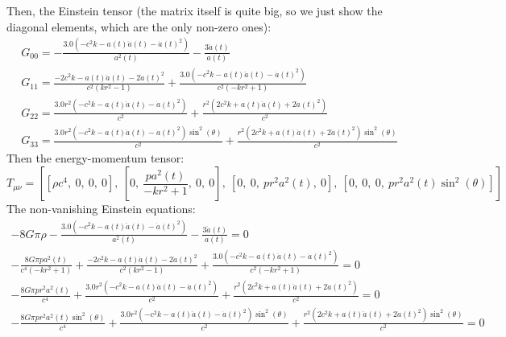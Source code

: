 \documentclass{article}
\begin{document}
Then, the Einstein tensor (the matrix itself is quite big, so we just show the diagonal elements, which are the only non-zero ones):
\begin{equation}
\begin{gathered}
    G_{00} = - \frac{3.0 \left(- c^{2} k - a{\left(t \right)} \ddot{a}(t) - \dot{a}(t)^{2}\right)}{a^{2}{\left(t \right)}} - \frac{3 \ddot{a}(t)}{a{\left(t \right)}}
    \\
    G_{11} = \frac{- 2 c^{2} k - a{\left(t \right)} \ddot{a}(t) - 2 \dot{a}(t)^{2}}{c^{2} \left(k r^{2} - 1\right)} + \frac{3.0 \left(- c^{2} k - a{\left(t \right)} \ddot{a}(t) - \dot{a}(t)^{2}\right)}{c^{2} \left(- k r^{2} + 1\right)}
    \\
    G_{22} = \frac{3.0 r^{2} \left(- c^{2} k - a{\left(t \right)} \ddot{a}(t) - \dot{a}(t)^{2}\right)}{c^{2}} + \frac{r^{2} \left(2 c^{2} k + a{\left(t \right)} \ddot{a}(t) + 2 \dot{a}(t)^{2}\right)}{c^{2}}
    \\
    G_{33} = \frac{3.0 r^{2} \left(- c^{2} k - a{\left(t \right)} \ddot{a}(t) - \dot{a}(t)^{2}\right) \sin^{2}{\left(\theta \right)}}{c^{2}} + \frac{r^{2} \left(2 c^{2} k + a{\left(t \right)} \ddot{a}(t) + 2 \dot{a}(t)^{2}\right) \sin^{2}{\left(\theta \right)}}{c^{2}}
\end{gathered}
\end{equation}
Then the energy-momentum tensor:
\begin{equation}
    T_{\mu \nu} = \left[ \left[ \rho c^{4}, \  0, \  0, \  0\right], \  \left[ 0, \  \frac{p a^{2}{\left(t \right)}}{- k r^{2} + 1}, \  0, \  0\right], \  \left[ 0, \ 
 0, \  p r^{2} a^{2}{\left(t \right)}, \  0\right], \  \left[ 0, \  0, \  0, \  p r^{2} a^{2}{\left(t \right)} \sin^{2}{\left(\theta \right)}\right]\right]
\end{equation}
The non-vanishing Einstein equations:
\begin{equation}
\begin{gathered}
    - 8 G \pi \rho - \frac{3.0 \left(- c^{2} k - a{\left(t \right)} \ddot{a}(t) - \dot{a}(t)^{2}\right)}{a^{2}{\left(t \right)}} - \frac{3 \ddot{a}(t)}{a{\left(t \right)}} = 0
    \\
    - \frac{8 G \pi p a^{2}{\left(t \right)}}{c^{4} \left(- k r^{2} + 1\right)} + \frac{- 2 c^{2} k - a{\left(t \right)} \ddot{a}(t) - 2 \dot{a}(t)^{2}}{c^{2} \left(k r^{2} - 1\right)} + \frac{3.0 \left(- c^{2} k - a{\left(t \right)} \ddot{a}(t) - \dot{a}(t)^{2}\right)}{c^{2} \left(- k r^{2} + 1\right)} = 0
    \\
    - \frac{8 G \pi p r^{2} a^{2}{\left(t \right)}}{c^{4}} + \frac{3.0 r^{2} \left(- c^{2} k - a{\left(t \right)} \ddot{a}(t) - \dot{a}(t)^{2}\right)}{c^{2}} + \frac{r^{2} \left(2 c^{2} k + a{\left(t \right)} \ddot{a}(t) + 2 \dot{a}(t)^{2}\right)}{c^{2}} = 0
    \\
    - \frac{8 G \pi p r^{2} a^{2}{\left(t \right)} \sin^{2}{\left(\theta \right)}}{c^{4}} + \frac{3.0 r^{2} \left(- c^{2} k - a{\left(t \right)} \ddot{a}(t) - \dot{a}(t)^{2}\right) \sin^{2}{\left(\theta \right)}}{c^{2}} + \frac{r^{2} \left(2 c^{2} k + a{\left(t \right)} \ddot{a}(t) + 2 \dot{a}(t)^{2}\right) \sin^{2}{\left(\theta \right)}}{c^{2}} = 0
\end{gathered}
\end{equation}
\end{document}
